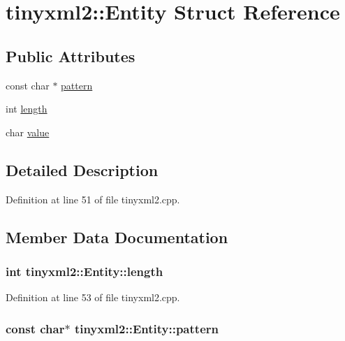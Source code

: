 \hypertarget{structtinyxml2_1_1_entity}{}\section{tinyxml2\+:\+:Entity Struct Reference}
\label{structtinyxml2_1_1_entity}
\subsection*{Public Attributes}
\begin{DoxyCompactItemize}
\item 
const char $\ast$ \hyperlink{structtinyxml2_1_1_entity_ab330f5d665d29bfc811ecfa76315894b}{pattern}
\item 
int \hyperlink{structtinyxml2_1_1_entity_a25e2b57cb59cb4fa68f283d7cb570f21}{length}
\item 
char \hyperlink{structtinyxml2_1_1_entity_a7334e81e33b4615655a403711b24f3ed}{value}
\end{DoxyCompactItemize}


\subsection{Detailed Description}


Definition at line 51 of file tinyxml2.\+cpp.



\subsection{Member Data Documentation}
\hypertarget{structtinyxml2_1_1_entity_a25e2b57cb59cb4fa68f283d7cb570f21}{}
\subsubsection[{length}]{\setlength{\rightskip}{0pt plus 5cm}int tinyxml2\+::\+Entity\+::length}\label{structtinyxml2_1_1_entity_a25e2b57cb59cb4fa68f283d7cb570f21}


Definition at line 53 of file tinyxml2.\+cpp.

\hypertarget{structtinyxml2_1_1_entity_ab330f5d665d29bfc811ecfa76315894b}{}
\subsubsection[{pattern}]{\setlength{\rightskip}{0pt plus 5cm}const char$\ast$ tinyxml2\+::\+Entity\+::pattern}\label{structtinyxml2_1_1_entity_ab330f5d665d29bfc811ecfa76315894b}


